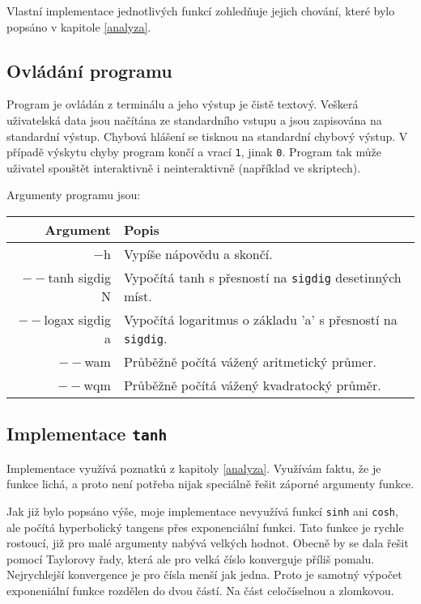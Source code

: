 \documentclass[12pt,a4paper,titlepage,final]{article}
\begin{document}
Vlastní implementace jednotlivých funkcí zohledňuje jejich chování, které
bylo popsáno v kapitole \ref{analyza}.

\subsection{Ovládání programu}

Program je ovládán z terminálu a jeho výstup je čistě textový. Veškerá uživatelská
data jsou načítána ze standardního vstupu a jsou zapisována na standardní výstup.
Chybová hlášení se tisknou na standardní chybový výstup. V případě výskytu chyby
program končí a vrací \texttt{1}, jinak \texttt{0}. Program tak může uživatel
spouštět interaktivně i neinteraktivně (například ve skriptech).\newline

\noindent
Argumenty programu jsou:

\begin{tabular}{r||l} \hline \hline
	Argument & Popis \\ \hline \hline
	$-$h		 & Vypíše nápovědu a skončí. \\
	$--$tanh sigdig N	 & Vypočítá tanh s přesností na \texttt{sigdig} desetinných míst. \\
	$--$logax sigdig a & Vypočítá logaritmus o základu 'a' s přesností na \texttt{sigdig}. \\
	$--$wam		 & Průběžně počítá vážený aritmetický průmer. \\
	$--$wqm		 & Průběžně počítá vážený kvadratocký průměr. \\
\end{tabular}

\subsection{Implementace \texttt{tanh}}

  Implementace využívá poznatků z kapitoly \ref{analyza}. Využívám faktu, že
  je funkce lichá, a proto není potřeba nijak speciálně řešit záporné argumenty
  funkce. 

  Jak již bylo popsáno výše, moje implementace nevyužívá funkcí \texttt{sinh} ani
  \texttt{cosh}, ale počítá hyperbolický tangens přes exponenciální funkci. Tato
  funkce je rychle rostoucí, již pro malé argumenty nabývá velkých hodnot. Obecně
  by se dala řešit pomocí Taylorovy řady, která ale
  pro velká číslo konverguje příliš pomalu. Nejrychlejší konvergence
  je pro čísla menší jak jedna. Proto je samotný výpočet exponeniální funkce rozdělen do
  dvou částí. Na část celočíselnou a zlomkovou.
\end{document}
